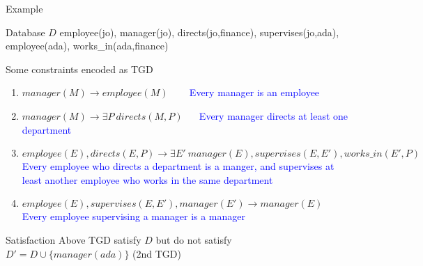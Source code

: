 \documentclass{beamer}
\begin{document}
 \begin{frame}{Example}
 \begin{block}{Database $D$}
 \tiny
 employee(jo),
 manager(jo),
 directs(jo,finance),
 supervises(jo,ada),
 employee(ada),
 works\_in(ada,finance)
 \end{block}
 
 
 \begin{block}{Some constraints encoded as TGD}
 \tiny
\begin{enumerate}
\item  $manager(M) \rightarrow employee(M)$ ~~~ \textcolor{blue}{Every manager is an employee}
 \item $manager(M) \rightarrow \exists P~ directs(M, P)$ ~~ \textcolor{blue}{Every manager directs at least one department}
 \item $employee(E), directs(E,P) \rightarrow \exists E' ~ manager(E), supervises (E, E'), works\_in(E',P)$\\
 \textcolor{blue}{Every employee who directs a department is a manger, and supervises at least another employee who works in the same department}
 
 \item $employee(E), supervises(E, E'), manager(E') \rightarrow manager(E)$\\
 \textcolor{blue}{Every employee supervising a manager is a manager}
 
 \end{enumerate}
 \end{block}
 
 \begin{block}{Satisfaction}
 Above TGD satisfy $D$ but do not satisfy $D' = D \cup \{manager (ada)\}$ (2nd TGD)
 \end{block}
 \end{frame}
 
\end{document}
